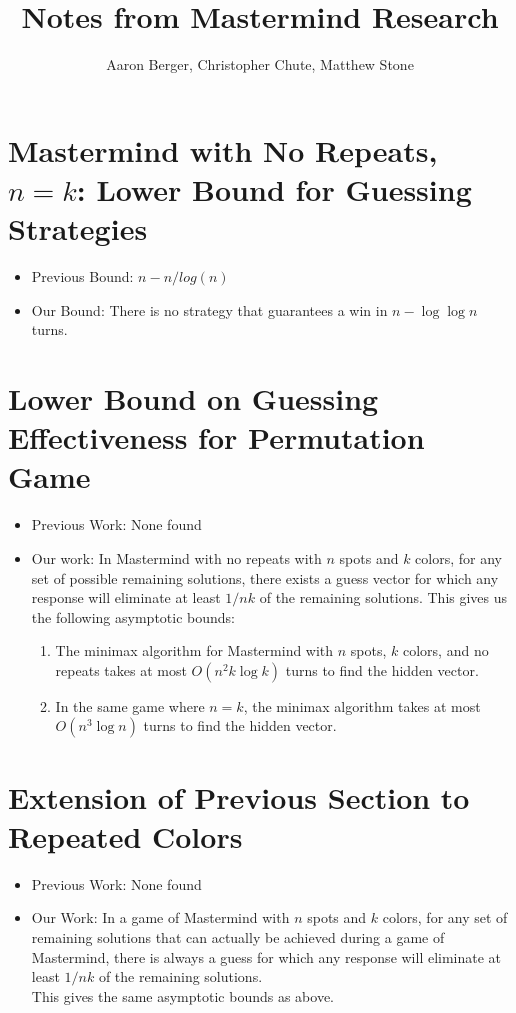 \documentclass[12pt, a4paper]{article}
\author{Aaron Berger, Christopher Chute, Matthew Stone}
\title{Notes from Mastermind Research}
\begin{document}
\section*{Mastermind with No Repeats, $n = k$: Lower Bound for Guessing Strategies}
	\begin{itemize}	
	\item Previous Bound: $n-n/log(n)$
	\item Our Bound:  There is no strategy that guarantees a win in $n-\log\log n$ turns.

	\end{itemize}
\section*{Lower Bound on Guessing Effectiveness for Permutation Game}
	\begin{itemize}
	\item Previous Work: None found
	\item Our work: In Mastermind with no repeats with $n$ spots and $k$ colors,
	for any set of possible remaining solutions, there exists a
	guess vector for which any response will eliminate at least $1/nk$ of the
	remaining solutions.
	This gives us the following asymptotic bounds:
		\begin{enumerate}[label=\roman*.]
		\item The minimax algorithm for Mastermind with $n$ spots, $k$
		colors, and no repeats takes at most $O(n^2k\log k)$ turns to find the
		hidden vector.
		
		\item In the same game where $n=k$, the minimax algorithm takes at most
		$O(n^3\log n)$ turns to find the hidden vector.
		\end{enumerate}
	
	\end{itemize}
	

\section*{Extension of Previous Section to Repeated Colors}
	
	\begin{itemize}
	\item Previous Work: None found
	\item Our Work: In a game of Mastermind with $n$ spots and $k$ colors, for any set of remaining
	solutions that can actually be achieved during a game of Mastermind,
	there is always a guess for which any response will eliminate at least
	$1/nk$ of the remaining solutions. \\
	This gives the same asymptotic bounds as above.
	
	\end{itemize}
\end{document}
